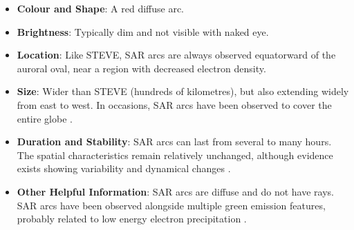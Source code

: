 \documentclass{article}
\renewcommand{\cite}[1]{\parencite{#1}}
\begin{document}
\begin{itemize}
\item {\bf Colour and Shape}: A red diffuse arc.
\item {\bf Brightness}: Typically dim and not visible with naked eye.
\item {\bf Location}: Like STEVE, SAR arcs are always observed equatorward of the auroral oval, near a region with decreased electron density.
\item {\bf Size}: Wider than STEVE (hundreds of kilometres), but also extending widely from east to west. In occasions, SAR arcs have been observed to cover the entire globe \cite{Mendillo2013}.
\item {\bf Duration and Stability}: SAR arcs can last from several to many hours. The spatial characteristics remain relatively unchanged, although evidence exists showing variability and dynamical changes \cite{Mendillo_2016a}.
\item {\bf Other Helpful Information}: SAR arcs are diffuse and do not have rays. SAR arcs have been observed alongside multiple green emission features, probably related to low energy electron precipitation \cite{Mendillo_2016a}.
\end{itemize}
\end{document}
